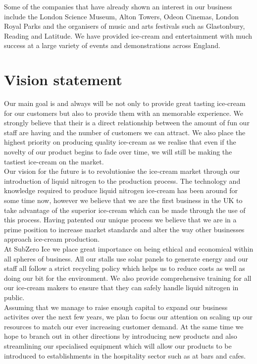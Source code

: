 \documentclass{article}
\begin{document}
Some of the companies that have already shown an interest in our business include the London Science Museum, Alton Towers, Odeon Cinemas, London Royal Parks and the organisers of music and arts festivals such as Glastonbury, Reading and Latitude. We have provided ice-cream and entertainment with much success at a large variety of events and demonstrations across England.


\section{Vision statement}

Our main goal is and always will be not only to provide great tasting ice-cream for our customers but also to provide them with an memorable experience. We strongly believe that their is a direct relationship between the amount of fun our staff are having and the number of customers we can attract. We also place the highest priority on producing quality ice-cream as we realise that even if the novelty of our product begins to fade over time, we will still be making the tastiest ice-cream on the market. \\

Our vision for the future is to revolutionise the ice-cream market through our introduction of liquid nitrogen to the production process. The technology and knowledge required to produce liquid nitrogen ice-cream has been around for some time now, however we believe that we are the first business in the UK to take advantage of the superior ice-cream which can be made through the use of this process. Having patented our unique process we believe that we are in a prime position to increase market standards and alter the way other businesses approach ice-cream production. \\

At SubZero Ice we place great importance on being ethical and economical within all spheres of business. All our stalls use solar panels to generate energy and our staff all follow a strict recycling policy which helps us to reduce costs as well as doing our bit for the environment. We also provide comprehensive training for all our ice-cream makers to ensure that they can safely handle liquid nitrogen in public. \\

Assuming that we manage to raise enough capital to expand our business activites over the next few years, we plan to focus our attention on scaling up our resources to match our ever increasing customer demand. At the same time we hope to branch out in other directions by introducing new products and also streamlining our specialised equipment which will allow our products to be introduced to establishments in the hospitality sector such as at bars and cafes. \\
\end{document}
